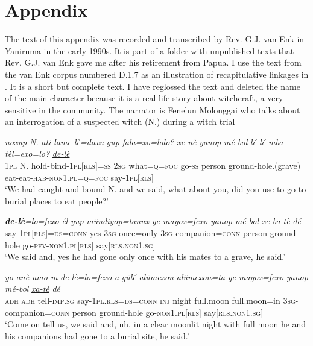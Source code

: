 \documentclass[output=paper]{LSP/langsci}
\begin{document}
\section*{Appendix}
 \setcounter{equation}{0}
The  text of this appendix was recorded and transcribed by Rev. G.J. van Enk in Yaniruma in the early 1990s. It is part of a folder with unpublished  texts that Rev. G.J. van Enk gave me after his retirement from Papua. I use the text from the van Enk corpus numbered D.1.7 as an illustration of recapitulative linkages in . It is a short but complete text. I have reglossed the text and deleted the name of the main character because it is a real life story about witchcraft, a very sensitive  in the  community. The narrator is Fenelun Molonggai who talks about an interrogation of a suspected witch (N.) during a witch trial\\


\begin{exe}
\ex \label{Devex:App1}
\gll \textit{noxup} \textit{N.} \textit{ati-lame-lè=daxu} \textit{gup} \textit{fala=xo=lolo?} \textit{xe-nè} \textit{yanop} \textit{mé-bol} \textit{lé-lé-mba-tèl=exo=lo?} \underline{\textit{de-lè}}\\
\textsc{1pl}	N. hold-bind-\textsc{1pl[rls]=ss} \textsc{2sg} what=\textsc{q=foc}	go-\textsc{ss} person ground-hole.(grave) eat-eat-\textsc{hab-non1.pl=q=foc} say-\textsc{1pl[rls]}\\
\glt `We had caught and bound N. and  we said, what about you, did you use to go to burial places to eat people?'
\end{exe}

\begin{exe}
\ex \label{Devex:App2}
\gll \textit{\textbf{de-lè}=lo=fexo} \textit{él} \textit{yup} \textit{mündiyop=tanux} \textit{ye-mayox=fexo} \textit{yanop} \textit{mé-bol} \textit{xe-ba-tè} \textit{dé}\\
say-\textsc{1pl[rls]=ds=conn} yes \textsc{3sg} once=only \textsc{3sg}-companion=\textsc{conn} person ground-hole go-\textsc{pfv-non1.pl[rls]}			say[\textsc{rls.non1.sg}]\\
\glt `We said and, yes he had gone only once with his mates to a grave, he said.'
\end{exe}			
			

\begin{exe}
\ex \label{Devex:App3}			
\gll \textit{yo}	\textit{anè}	\textit{umo-m} \textit{de-lè=lo=fexo}	\textit{a} \textit{gülé} \textit{alümexon} \textit{alümexon=ta}	\textit{ye-mayox=fexo} \textit{yanop}	\textit{mé-bol} \underline{\textit{xa-tè}} \textit{dé}\\
\textsc{adh}	\textsc{adh}	tell-\textsc{imp.sg}	say-\textsc{1pl.rls=ds=conn}	\textsc{inj}	night full.moon full.moon=in \textsc{3sg}-companion=\textsc{conn}	person		ground-hole	go-\textsc{non1.pl[rls]}	say[\textsc{rls.non1.sg}]\\
\glt `Come on tell us, we said and, uh, in a clear moonlit night with full moon he and his companions had gone to a burial site, he said.'\\
\end{exe}			
\end{document}
